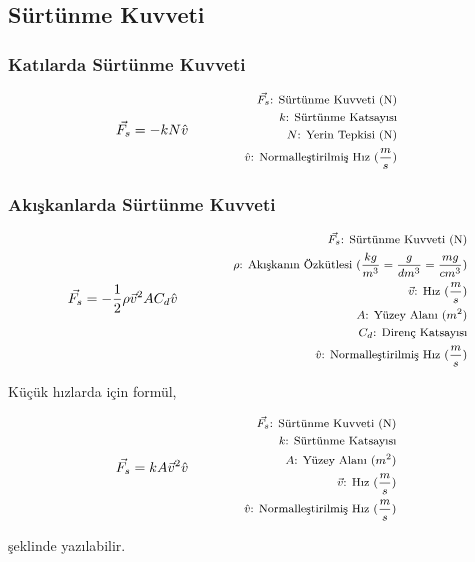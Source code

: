 \subsection{Sürtünme Kuvveti}

\subsubsection*{Katılarda Sürtünme Kuvveti}

\begin{equation}
    \vec{F_s} = -kN\hat{v} \qquad \qquad \parbox{4cm}{\footnotesize$\begin{aligned}
        \vec{F_s}\text{: Sürtünme Kuvveti (N)} \\
        k\text{: Sürtünme Katsayısı} \\ 
        N\text{: Yerin Tepkisi (N)} \\
        \hat{v}\text{: Normalleştirilmiş Hız } (\frac{m}{s}) 
\end{aligned}$}
\end{equation}

\subsubsection*{Akışkanlarda Sürtünme Kuvveti}
\begin{equation}
    \vec{F_s} = -\frac{1}{2}\rho \vec{v}^2 A C_d \hat{v} \qquad \qquad \parbox{5.5cm}{\footnotesize$\begin{aligned}
        \vec{F_s}\text{: Sürtünme Kuvveti (N)} \\
        \rho\text{: Akışkanın Özkütlesi } (\frac{kg}{m^3} = \frac{g}{dm^3} = \frac{mg}{cm^3})  \\
        \vec{v}\text{: Hız } (\frac{m}{s}) \\
        A\text{: Yüzey Alanı } (m^2) \\
        C_d\text{: Direnç Katsayısı} \\
        \hat{v}\text{: Normalleştirilmiş Hız } (\frac{m}{s}) 
\end{aligned}$}
\end{equation}

Küçük hızlarda için formül,

\begin{equation}
    \vec{F_s} = k A \vec{v}^2 \hat{v} \qquad \qquad \parbox{4cm}{\footnotesize$\begin{aligned}
        \vec{F_s}\text{: Sürtünme Kuvveti (N)} \\
        k\text{: Sürtünme Katsayısı} \\ 
        A\text{: Yüzey Alanı } (m^2) \\
        \vec{v}\text{: Hız } (\frac{m}{s}) \\
        \hat{v}\text{: Normalleştirilmiş Hız } (\frac{m}{s}) 
\end{aligned}$}
\end{equation}

şeklinde yazılabilir.